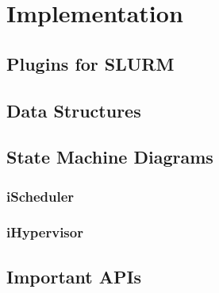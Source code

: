 \chapter{Implementation}\label{chapter:implementation}
\section{Plugins for SLURM}
\section{Data Structures}
\section{State Machine Diagrams}
\subsection{iScheduler}
\subsection{iHypervisor}
\section{Important APIs}

